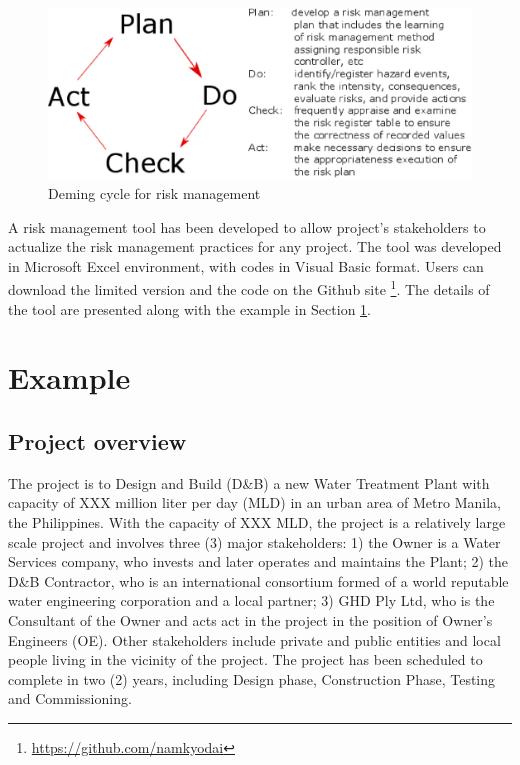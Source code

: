 \documentclass[10pt,halfline,a4paper]{ouparticle}
\let\oldurl\url
\let\linkurl\url
\let\url\oldurl
\begin{document}
\begin{figure}[!ht]
\centering \includegraphics[scale=0.4]{demingcyclerisk} \caption{Deming cycle for risk management}
\label{demingcyclerisk} 
\end{figure}

A risk management tool has been developed to allow project's stakeholders to actualize the risk management practices for any project. The tool was developed in Microsoft Excel environment, with codes in Visual Basic format. Users can download the limited version and the code on the Github site \footnote{\linkurl{https://github.com/namkyodai}}. The details of the tool are presented along with the example in Section \ref{sec5}.

\section{Example}
\label{sec5}
\subsection{Project overview}
The project is to Design and Build (D\&B) a new Water Treatment Plant with capacity of XXX million liter per day (MLD) in an urban area of Metro Manila, the Philippines. With the capacity of XXX MLD, the project is a relatively large scale project and involves three (3) major stakeholders: 1) the Owner is a Water Services company, who invests and later operates and maintains the Plant; 2) the D\&B Contractor, who is an international consortium formed of a world reputable water engineering corporation and a local partner; 3) GHD Ply Ltd, who is the Consultant of the Owner and acts act in the project in the position of Owner's Engineers (OE). Other stakeholders include private and public entities and local people living in the vicinity of the project. The project has been scheduled to complete in two (2) years, including Design phase, Construction Phase, Testing and Commissioning.
\end{document}
